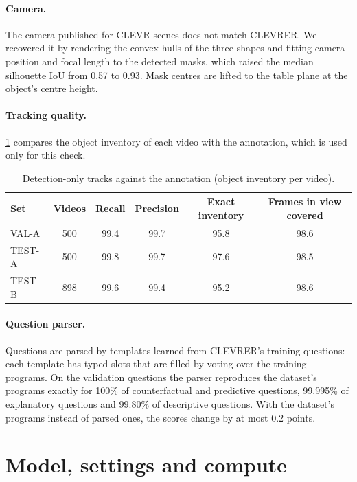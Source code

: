 \documentclass[10pt,onecolumn,letterpaper]{article}
\begin{document}
\paragraph{Camera.}
The camera published for CLEVR scenes does not match CLEVRER.
We recovered it by rendering the convex hulls of the three shapes and fitting camera position and focal length to the detected masks, which raised the median silhouette IoU from 0.57 to 0.93.
Mask centres are lifted to the table plane at the object's centre height.

\paragraph{Tracking quality.}
\cref{tab:percep} compares the object inventory of each video with the annotation, which is used only for this check.

\begin{table}[h]
\caption{Detection-only tracks against the annotation (object inventory per video).}
\label{tab:percep}
\centering
\small
\begin{tabular}{@{}lccccc@{}}
\toprule
Set & Videos & Recall & Precision & Exact inventory & Frames in view covered \\
\midrule
VAL-A & 500 & 99.4 & 99.7 & 95.8 & 98.6 \\
TEST-A & 500 & 99.8 & 99.7 & 97.6 & 98.5 \\
TEST-B & 898 & 99.6 & 99.4 & 95.2 & 98.6 \\
\bottomrule
\end{tabular}
\end{table}

\paragraph{Question parser.}
Questions are parsed by templates learned from CLEVRER's training questions: each template has typed slots that are filled by voting over the training programs.
On the validation questions the parser reproduces the dataset's programs exactly for 100\% of counterfactual and predictive questions, 99.995\% of explanatory questions and 99.80\% of descriptive questions.
With the dataset's programs instead of parsed ones, the scores change by at most 0.2 points.

\section{Model, settings and compute}
\label{app:settings}
\end{document}
